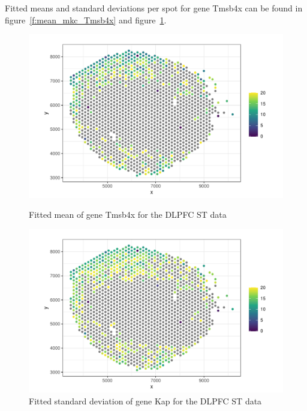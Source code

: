 \documentclass{article}\usepackage[]{graphicx}\usepackage[]{xcolor}
\makeatletter
\def\maxwidth{ %
  \ifdim\Gin@nat@width>\linewidth
    \linewidth
  \else
    \Gin@nat@width
  \fi
}
\newenvironment{knitrout}{}{} %
\makeatother
\begin{document}
Fitted means and standard deviations per spot for gene Tmsb4x can be found in figure~\ref{f:mean_mkc_Tmsb4x} and figure~\ref{f:sd_mkc_Tmsb4x}.

\begin{figure}[h]
\begin{minipage}[c]{0.5\textwidth}
\begin{knitrout}
\color{fgcolor}

{\centering \includegraphics[width=\maxwidth]{plots/pc14-1} 

}


\end{knitrout}
  \caption{Fitted mean of gene Tmsb4x for the DLPFC ST data}
\label{f:mean_mkc_Tmsb4x}
\end{minipage}
\hfill
\begin{minipage}[c]{0.5\textwidth}
\begin{knitrout}
\color{fgcolor}

{\centering \includegraphics[width=\maxwidth]{plots/pc15-1} 

}


\end{knitrout}
  \caption{Fitted standard deviation of gene Kap for the DLPFC ST data}
\label{f:sd_mkc_Tmsb4x}
\end{minipage}
\end{figure}
\end{document}

